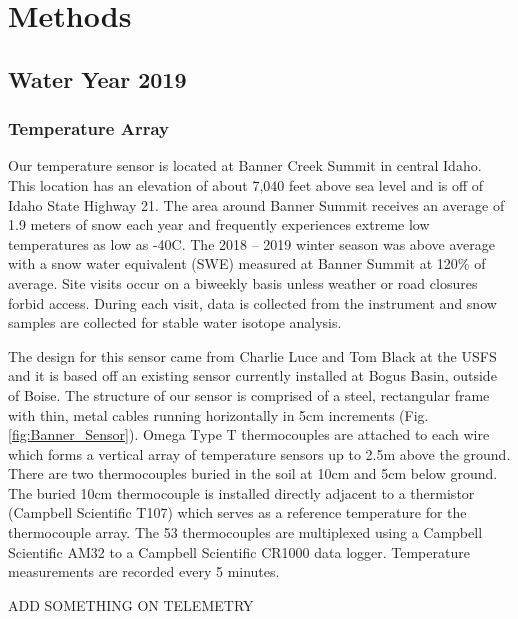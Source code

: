 \chapter{Methods}
\section{Water Year 2019} 
\subsection{Temperature Array}
Our temperature sensor is located at Banner Creek Summit in central Idaho. This location has an elevation of about 7,040 feet above sea level and is off of Idaho State Highway 21. The area around Banner Summit receives an average of 1.9 meters of snow each year and frequently experiences extreme low temperatures as low as -40\textdegree C. The 2018 -- 2019 winter season was above average with a snow water equivalent (SWE) measured at Banner Summit at 120\% of average. Site visits occur on a biweekly basis unless weather or road closures forbid access. During each visit, data is collected from the instrument and snow samples are collected for stable water isotope analysis.

The design for this sensor came from Charlie Luce and Tom Black at the USFS and it is based off an existing sensor currently installed at Bogus Basin, outside of Boise. The structure of our sensor is comprised of a steel, rectangular frame with thin, metal cables running horizontally in 5cm increments (Fig. \ref{fig:Banner_Sensor}). Omega Type T thermocouples are attached to each wire which forms a vertical array of temperature sensors up to 2.5m above the ground. There are two thermocouples buried in the soil at 10cm and 5cm below ground. The buried 10cm thermocouple is installed directly adjacent to a thermistor (Campbell Scientific T107) which serves as a reference temperature for the thermocouple array. The 53 thermocouples are multiplexed using a Campbell Scientific AM32 to a Campbell Scientific CR1000 data logger. Temperature measurements are recorded every 5 minutes. 

ADD SOMETHING ON TELEMETRY

